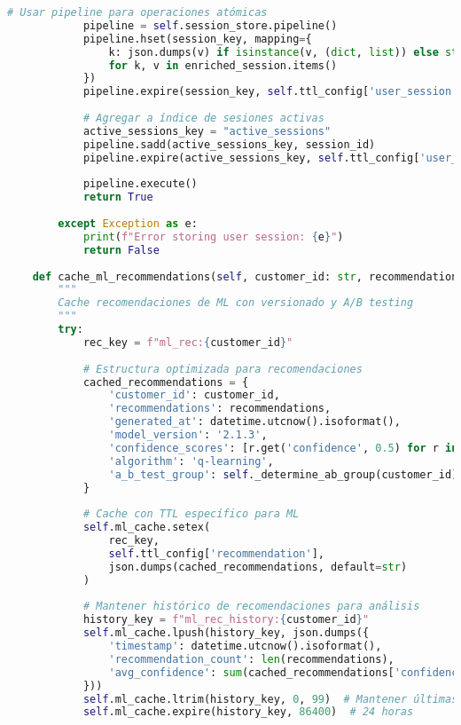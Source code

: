 \begin{lstlisting}[language=python, caption=Implementación de Patrones de Caché Avanzados, label=lst:redis_patterns]
            # Usar pipeline para operaciones atómicas
            pipeline = self.session_store.pipeline()
            pipeline.hset(session_key, mapping={
                k: json.dumps(v) if isinstance(v, (dict, list)) else str(v)
                for k, v in enriched_session.items()
            })
            pipeline.expire(session_key, self.ttl_config['user_session'])
            
            # Agregar a índice de sesiones activas
            active_sessions_key = "active_sessions"
            pipeline.sadd(active_sessions_key, session_id)
            pipeline.expire(active_sessions_key, self.ttl_config['user_session'])
            
            pipeline.execute()
            return True
            
        except Exception as e:
            print(f"Error storing user session: {e}")
            return False
    
    def cache_ml_recommendations(self, customer_id: str, recommendations: List[Dict]) -> bool:
        """
        Cache recomendaciones de ML con versionado y A/B testing
        """
        try:
            rec_key = f"ml_rec:{customer_id}"
            
            # Estructura optimizada para recomendaciones
            cached_recommendations = {
                'customer_id': customer_id,
                'recommendations': recommendations,
                'generated_at': datetime.utcnow().isoformat(),
                'model_version': '2.1.3',
                'confidence_scores': [r.get('confidence', 0.5) for r in recommendations],
                'algorithm': 'q-learning',
                'a_b_test_group': self._determine_ab_group(customer_id)
            }
            
            # Cache con TTL específico para ML
            self.ml_cache.setex(
                rec_key,
                self.ttl_config['recommendation'],
                json.dumps(cached_recommendations, default=str)
            )
            
            # Mantener histórico de recomendaciones para análisis
            history_key = f"ml_rec_history:{customer_id}"
            self.ml_cache.lpush(history_key, json.dumps({
                'timestamp': datetime.utcnow().isoformat(),
                'recommendation_count': len(recommendations),
                'avg_confidence': sum(cached_recommendations['confidence_scores']) / len(recommendations) if recommendations else 0
            }))
            self.ml_cache.ltrim(history_key, 0, 99)  # Mantener últimas 100
            self.ml_cache.expire(history_key, 86400)  # 24 horas
            

\end{lstlisting}
